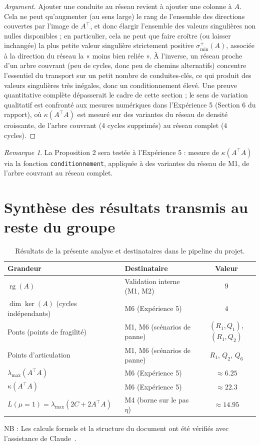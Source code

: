 \documentclass[11pt,a4paper]{article}
\theoremstyle{plain}
\theoremstyle{definition}
\theoremstyle{remark}
\newtheorem{remarque}{Remarque}
\begin{document}
\begin{proof}[Argument]
Ajouter une conduite au réseau revient à ajouter une colonne à $A$. Cela
ne peut qu'augmenter (au sens large) le rang de l'ensemble des directions
couvertes par l'image de $A^\top$, et donc élargir l'ensemble des valeurs
singulières non nulles disponibles ; en particulier, cela ne peut que faire
croître (ou laisser inchangée) la plus petite valeur singulière strictement
positive $\sigma_{\min}^{+}(A)$, associée à la direction du réseau la
« moins bien reliée ». À l'inverse, un réseau proche d'un arbre couvrant
(peu de cycles, donc peu de chemins alternatifs) concentre l'essentiel du
transport sur un petit nombre de conduites-clés, ce qui produit des
valeurs singulières très inégales, donc un conditionnement élevé. Une
preuve quantitative complète dépasserait le cadre de cette section ; le
sens de variation qualitatif est confronté aux mesures numériques dans
l'Expérience 5 (Section 6 du rapport), où $\kappa(A^\top A)$ est mesuré
sur des variantes du réseau de densité croissante, de l'arbre couvrant
($4$ cycles supprimés) au réseau complet ($4$ cycles).
\end{proof}

\begin{remarque}
La Proposition 2 sera testée à l'Expérience 5 : mesure de
$\kappa(A^\top A)$ via la fonction \texttt{conditionnement}, appliquée à
des variantes du réseau de M1, de l'arbre couvrant au réseau complet.
\end{remarque}

\section{Synthèse des résultats transmis au reste du groupe}

\begin{table}[h]
\centering
\begin{tabular}{@{}llc@{}}
\toprule
Grandeur & Destinataire & Valeur \\
\midrule
$\operatorname{rg}(A)$ & Validation interne (M1, M2) & $9$ \\
$\dim \ker(A)$ (cycles indépendants) & M6 (Expérience 5) & $4$ \\
Ponts (points de fragilité) & M1, M6 (scénarios de panne) & $(R_1,Q_1)$, $(R_1,Q_2)$ \\
Points d'articulation & M1, M6 (scénarios de panne) & $R_1$, $Q_2$, $Q_6$ \\
$\lambda_{\max}(A^\top A)$ & M6 (Expérience 5) & $\approx 6.25$ \\
$\kappa(A^\top A)$ & M6 (Expérience 5) & $\approx 22.3$ \\
$L(\mu{=}1) = \lambda_{\max}(2C + 2A^\top A)$ & M4 (borne sur le pas $\eta$) & $\approx 14.95$ \\
\bottomrule
\end{tabular}
\caption{Résultats de la présente analyse et destinataires dans le
pipeline du projet.}
\end{table}
NB : Les calculs formels et la structure du document ont été vérifiés avec l'assistance de Claude~\cite{claude}.
\renewcommand{\refname}{Références bibliographiques}
\end{document}
